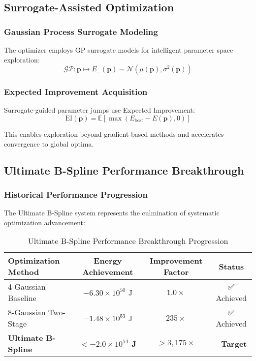 \documentclass[11pt]{article}
\begin{document}
\subsection{Surrogate-Assisted Optimization}

\subsubsection{Gaussian Process Surrogate Modeling}

The optimizer employs GP surrogate models for intelligent parameter space exploration:
\begin{equation}
\mathcal{GP}: \mathbf{p} \mapsto E_-(\mathbf{p}) \sim \mathcal{N}(\mu(\mathbf{p}), \sigma^2(\mathbf{p}))
\end{equation}

\subsubsection{Expected Improvement Acquisition}

Surrogate-guided parameter jumps use Expected Improvement:
\begin{equation}
\text{EI}(\mathbf{p}) = \mathbb{E}[\max(E_{\text{best}} - E(\mathbf{p}), 0)]
\end{equation}

This enables exploration beyond gradient-based methods and accelerates convergence to global optima.

\subsection{Ultimate B-Spline Performance Breakthrough}

\subsubsection{Historical Performance Progression}

The Ultimate B-Spline system represents the culmination of systematic optimization advancement:

\begin{table}[h]
\centering
\begin{tabular}{lccc}
\toprule
Optimization Method & Energy Achievement & Improvement Factor & Status \\
\midrule
4-Gaussian Baseline & $-6.30 \times 10^{50}$ J & $1.0\times$ & ✅ Achieved \\
8-Gaussian Two-Stage & $-1.48 \times 10^{53}$ J & $235\times$ & ✅ Achieved \\
\textbf{Ultimate B-Spline} & \textbf{$< -2.0 \times 10^{54}$ J} & \textbf{$> 3,175\times$} & \textbf{🎯 Target} \\
\bottomrule
\end{tabular}
\caption{Ultimate B-Spline Performance Breakthrough Progression}
\label{tab:ultimate_performance}
\end{table}
\end{document}
